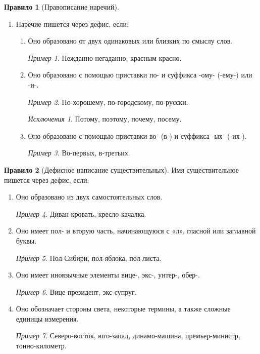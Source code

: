 \documentclass[12pt]{article}
\theoremstyle{definition}
\newtheorem{rrule}{Правило}[section]
\theoremstyle{remark}
\newtheorem*{example}{Пример}
\newtheorem*{exception}{Исключения}
\begin{document}
\begin{rrule}[Правописание наречий]
\begin{enumerate}
        \item Наречие пишется через дефис, если:
        \begin{enumerate}
            \item Оно образовано от двух одинаковых или близких по смыслу слов.
            \begin{example}
                Нежданно-негаданно, красным-красно.
            \end{example}
            \item Оно образовано с помощью приставки по- и суффикса -ому- (-ему-) или -и-.
            \begin{example}
                По-хорошему, по-городскому, по-русски.
            \end{example}
            \begin{exception}
                Потому, поэтому, почему, посему.
            \end{exception}
            \item Оно образовано с помощью приставки во- (в-) и суффикса -ых- (-их-).
            \begin{example}
                Во-первых, в-третьих.
            \end{example}
        \end{enumerate}
    \end{enumerate}
\end{rrule}

\begin{rrule}[Дефисное написание существительных] Имя существительное пишется через дефис, если:
    \begin{enumerate}
        \item Оно образовано из двух самостоятельных слов.
        \begin{example}
            Диван-кровать, кресло-качалка.
        \end{example}
        \item Оно имеет пол- и вторую часть, начинающуюся с «л», гласной или заглавной буквы.
        \begin{example}
            Пол-Сибири, пол-яблока, пол-листа.
        \end{example}
        \item Оно имеет иноязычные элементы вице-, экс-, унтер-, обер-.
        \begin{example}
            Вице-президент, экс-супруг.
        \end{example}
        \item Оно обозначает стороны света, некоторые термины, а также сложные единицы измерения.
        \begin{example}
            Северо-восток, юго-запад, динамо-машина, премьер-министр, тонно-километр.
        \end{example}
    \end{enumerate}
\end{rrule}
\end{document}
